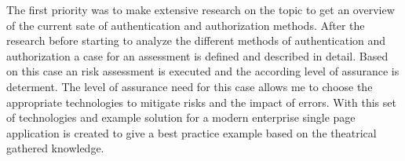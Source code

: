 The first priority was to make extensive research on the topic to get an overview of the current sate of authentication and authorization methods. After the research before starting to analyze the different methods of authentication and authorization a case for an assessment is defined and described in detail. Based on this case an risk assessment is executed and the according level of assurance is determent. The level of assurance need for this case allows me to choose the appropriate technologies to mitigate risks and the impact of errors. With this set of technologies and example solution for a modern enterprise single page application is created to give a best practice example based on the theatrical gathered knowledge.  


\chapterend
